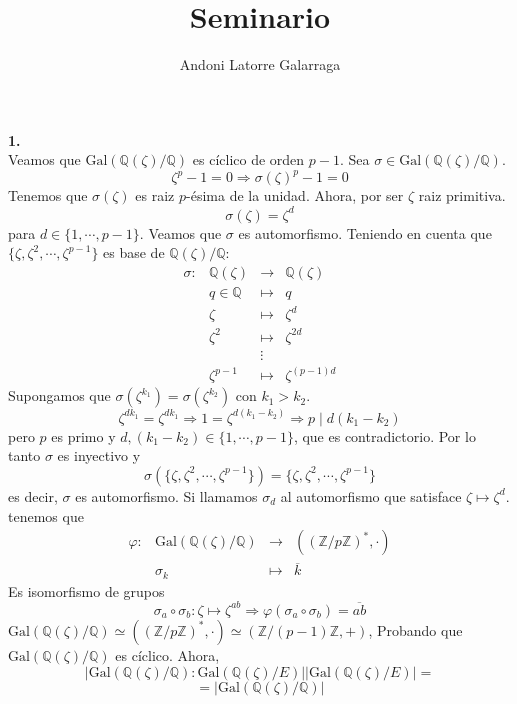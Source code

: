 \documentclass{article}
\title{Seminario}
\author{Andoni Latorre Galarraga}
\date{}
\newcommand{\bb}[1]{\mathbb{#1}}
\begin{document}
\maketitle
\begin{multicols}{2}
\noindent \textbf{1.}\\
Veamos que $\text{Gal}(\bb{Q}(\zeta)/\bb{Q})$ es cíclico de orden $p-1$. Sea $\sigma \in \text{Gal}(\bb{Q}(\zeta)/\bb{Q})$.
$$
\zeta^p -1 = 0 \Rightarrow \sigma(\zeta)^p -1 = 0
$$
Tenemos que $\sigma(\zeta)$ es raiz $p$-ésima de la unidad. Ahora, por ser $\zeta$ raiz primitiva.
$$
\sigma(\zeta) = \zeta^d
$$
para $d\in \{1, \cdots, p-1\}$. Veamos que $\sigma$ es automorfismo. Teniendo en cuenta que $\{\zeta, \zeta^2,\cdots, \zeta^{p-1}\}$ es base de $\bb{Q}(\zeta)/\bb{Q}$:
$$
\begin{array}{clcl}
\sigma : & \bb{Q}(\zeta) & \longrightarrow & \bb{Q}(\zeta) \\
& q\in\bb{Q} & \longmapsto     & q \\
& \zeta & \longmapsto     & \zeta^d \\
& \zeta^2 & \longmapsto     & \zeta^{2d}\\
& & \vdots & \\
& \zeta^{p-1} & \longmapsto     & \zeta^{(p-1)d}
\end{array}
$$
Supongamos que $\sigma(\zeta^{k_1}) = \sigma(\zeta^{k_2})$ con $k_1 > k_2$.
$$
\zeta^{dk_1} = \zeta^{dk_1} \Rightarrow 1 = \zeta^{d(k_1-k_2)} \Rightarrow p\mid d(k_1-k_2)
$$
pero $p$ es primo y $d, (k_1-k_2) \in \{1, \cdots, p-1\}$, que es contradictorio. Por lo tanto $\sigma$ es inyectivo y
$$
\sigma(\{\zeta, \zeta^2,\cdots, \zeta^{p-1}\}) = \{\zeta, \zeta^2,\cdots, \zeta^{p-1}\}
$$
es decir, $\sigma$ es automorfismo. Si llamamos $\sigma_d$ al automorfismo que satisface $\zeta \longmapsto \zeta^d$. tenemos que
$$
\begin{array}{crcl}
\varphi : & \text{Gal}(\bb{Q}(\zeta)/\bb{Q}) & \longrightarrow & ((\bb{Z}/p\bb{Z})^*, \cdot) \\
& \sigma_k & \longmapsto     & \overline{k}
\end{array}
$$
Es isomorfismo de grupos
$$
\sigma_a \circ \sigma_b : \zeta \longmapsto \zeta^{ab} \Rightarrow \varphi(\sigma_a \circ \sigma_b) = \overline{ab}
$$
$\text{Gal}(\bb{Q}(\zeta)/\bb{Q}) \simeq ((\bb{Z}/p\bb{Z})^*, \cdot) \simeq (\bb{Z}/(p-1)\bb{Z}, +)$, Probando que $\text{Gal}(\bb{Q}(\zeta)/\bb{Q})$ es cíclico. Ahora,
$$
|\text{Gal}(\bb{Q}(\zeta)/\bb{Q}) : \text{Gal}(\bb{Q}(\zeta)/E) | | \text{Gal}(\bb{Q}(\zeta)/E) | =
$$
$$
= | \text{Gal}(\bb{Q}(\zeta)/\bb{Q}) |
$$
\end{multicols}
\end{document}
